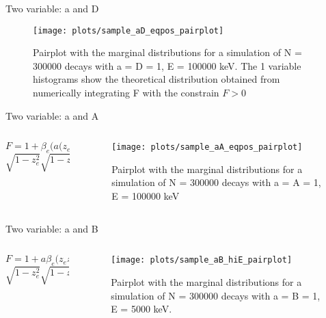 \documentclass{beamer}
\begin{document}
\begin{frame}{Two variable: a and D}
	\begin{figure}
		\centering
		\texttt{[image: plots/sample\_aD\_eqpos\_pairplot]}
		\caption{Pairplot with the marginal distributions for a simulation of N = 300000 decays with a = D = 1, E = 100000 keV. The 1 variable histograms show the theoretical distribution obtained from numerically integrating F with the constrain $F > 0$}
	\end{figure}
\end{frame}


\begin{frame}{Two variable: a and A}
	\begin{columns}
		\begin{column}{0.4\textwidth}
			$$F = 1 + \beta_e(a (z_ez_\nu +$$$$ \sqrt{1-z^2_e}\sqrt{1-z^2_\nu}\cos \phi) + Az_e)$$
		\end{column}

	\begin{column}{0.6\textwidth}
		\begin{figure}
			\centering
			\texttt{[image: plots/sample\_aA\_eqpos\_pairplot]}
			\caption{Pairplot with the marginal distributions for a simulation of N = 300000 decays with a = A = 1, E = 100000 keV}
		\end{figure}
		\end{column}
	\end{columns}
\end{frame}


\begin{frame}{Two variable: a and B}
	\begin{columns}
		\begin{column}{0.4\textwidth}
			$$F = 1 + a\beta_e(z_ez_\nu +$$$$ \sqrt{1-z^2_e}\sqrt{1-z^2_\nu}\cos \phi) + Bz_\nu$$
		\end{column}
		
		\begin{column}{0.6\textwidth}
			\begin{figure}
				\centering
				\texttt{[image: plots/sample\_aB\_hiE\_pairplot]}
				\caption{Pairplot with the marginal distributions for a simulation of N = 300000 decays with a = B = 1, E = 5000 keV.}
			\end{figure}
		\end{column}
	\end{columns}
\end{frame}
\end{document}

